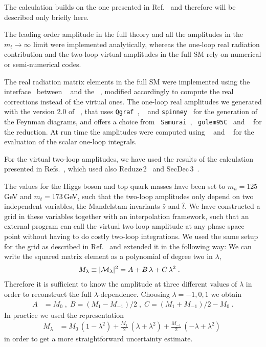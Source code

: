 The calculation builds on the one presented in Ref.~\cite{Heinrich:2017kxx} and therefore will be described only briefly here. 

The leading order amplitude in the full theory and  all the
amplitudes in the $m_t\to\infty$ limit were implemented analytically, whereas the
one-loop real radiation contribution and the two-loop virtual
amplitudes in the full SM rely on numerical or semi-numerical
codes.

The real radiation matrix elements in the full SM were implemented
using the interface~\cite{Luisoni:2013cuh}
between \gosam~\cite{Cullen:2011ac,Cullen:2014yla} and
the \powhegbox~\cite{Nason:2004rx,Frixione:2007vw,Alioli:2010xd}, modified
accordingly to compute the real corrections instead of the virtual
ones. The one-loop real amplitudes we generated with the version
2.0 of \gosam{}~\cite{Cullen:2014yla}, that
uses {\tt Qgraf}~\cite{Nogueira:1991ex}, \form~\cite{Kuipers:2012rf} and
{\tt spinney}~\cite{Cullen:2010jv} for the generation of the Feynman
diagrams, and offers a choice from {\tt
Samurai}~\cite{Mastrolia:2010nb,vanDeurzen:2013pja}, {\tt
golem95C}~\cite{Binoth:2008uq,Cullen:2011kv,Guillet:2013msa}
and \ninja{}~\cite{Peraro:2014cba} for the
reduction.  At run time the amplitudes were computed using
\ninja{}~\cite{Peraro:2014cba} and \avholo{}~\cite{vanHameren:2010cp}
for the evaluation of the scalar one-loop integrals.

For the virtual two-loop amplitudes, we have used the results of the
calculation presented in Refs.~\cite{Borowka:2016ehy,Borowka:2016ypz},
which used also {\sc Reduze}\,2~\cite{vonManteuffel:2012np} and {\sc
 SecDec}\,3~\cite{Borowka:2015mxa}.

The values for the Higgs boson and top quark masses have been set to
$m_h=125$\,GeV and $m_t=173$\,GeV, such that the two-loop amplitudes
only depend on two independent variables, the Mandelstam invariants
$\hat{s}$ and $\hat{t}$.  We have constructed a grid in these
variables together with an interpolation framework, such that an
external program can call the virtual two-loop amplitude at any phase space
point without having to do costly two-loop integrations.
We used the same setup for the grid as described in Ref.~\cite{Heinrich:2017kxx} and extended it in the following way:
We can write the squared matrix element as a polynomial of degree two in $\lambda$, 
\begin{align}
M_\lambda& \equiv |{\cal M}_\lambda|^2=A+B\,\lambda + C\,\lambda^2\;. \label{eq-amplambdadep}
\end{align}
Therefore it is sufficient to know the amplitude at three different values of $\lambda$ in order to reconstruct the full $\lambda$-dependence. 
Choosing $\lambda=-1,0,1$ we obtain
\begin{align}
A&=M_0\;,\; B=(M_1-M_{-1})/2\;,\; C=(M_1+M_{-1})/2-M_0\;.
\end{align}
In practice we used the representation 
\begin{align}
M_\lambda &=M_0\,(1-\lambda^2)+\frac{M_1}{2}\,(\lambda+\lambda^2) + \frac{M_{-1}}{2}\,(-\lambda+\lambda^2)\;
\end{align}
in order to get a more straightforward uncertainty estimate.

